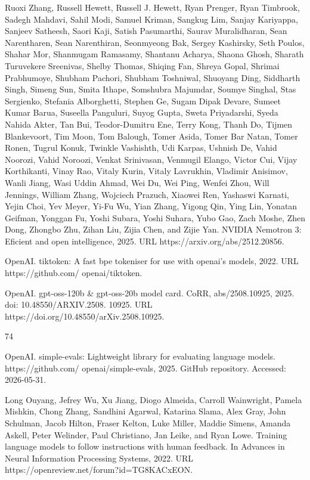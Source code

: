 \documentclass[
  10
]{article}
\begin{document}
Ruoxi Zhang, Russell Hewett, Russell J. Hewett, Ryan Prenger, Ryan
Timbrook, Sadegh Mahdavi, Sahil Modi, Samuel Kriman, Sangkug Lim, Sanjay
Kariyappa, Sanjeev Satheesh, Saori Kaji, Satish Pasumarthi, Saurav
Muralidharan, Sean Narentharen, Sean Narenthiran, Seonmyeong Bak, Sergey
Kashirsky, Seth Poulos, Shahar Mor, Shanmugam Ramasamy, Shantanu
Acharya, Shaona Ghosh, Sharath Turuvekere Sreenivas, Shelby Thomas,
Shiqing Fan, Shreya Gopal, Shrimai Prabhumoye, Shubham Pachori, Shubham
Toshniwal, Shuoyang Ding, Siddharth Singh, Simeng Sun, Smita Ithape,
Somshubra Majumdar, Soumye Singhal, Stas Sergienko, Stefania
Alborghetti, Stephen Ge, Sugam Dipak Devare, Sumeet Kumar Barua,
Suseella Panguluri, Suyog Gupta, Sweta Priyadarshi, Syeda Nahida Akter,
Tan Bui, Teodor-Dumitru Ene, Terry Kong, Thanh Do, Tijmen Blankevoort,
Tim Moon, Tom Balough, Tomer Asida, Tomer Bar Natan, Tomer Ronen, Tugrul
Konuk, Twinkle Vashishth, Udi Karpas, Ushnish De, Vahid Noorozi, Vahid
Noroozi, Venkat Srinivasan, Venmugil Elango, Victor Cui, Vijay
Korthikanti, Vinay Rao, Vitaly Kurin, Vitaly Lavrukhin, Vladimir
Anisimov, Wanli Jiang, Wasi Uddin Ahmad, Wei Du, Wei Ping, Wenfei Zhou,
Will Jennings, William Zhang, Wojciech Prazuch, Xiaowei Ren, Yashaswi
Karnati, Yejin Choi, Yev Meyer, Yi-Fu Wu, Yian Zhang, Yigong Qin, Ying
Lin, Yonatan Geifman, Yonggan Fu, Yoshi Subara, Yoshi Suhara, Yubo Gao,
Zach Moshe, Zhen Dong, Zhongbo Zhu, Zihan Liu, Zijia Chen, and Zijie
Yan. NVIDIA Nemotron 3: Eficient and open intelligence, 2025. URL
https://arxiv.org/abs/2512.20856.

OpenAI. tiktoken: A fast bpe tokeniser for use with openai's models,
2022. URL https://github.com/ openai/tiktoken.

OpenAI. gpt-oss-120b \& gpt-oss-20b model card. CoRR, abs/2508.10925,
2025. doi: 10.48550/ARXIV.2508. 10925. URL
https://doi.org/10.48550/arXiv.2508.10925.

74

OpenAI. simple-evals: Lightweight library for evaluating language
models. https://github.com/ openai/simple-evals, 2025. GitHub
repository. Accessed: 2026-05-31.

Long Ouyang, Jefrey Wu, Xu Jiang, Diogo Almeida, Carroll Wainwright,
Pamela Mishkin, Chong Zhang, Sandhini Agarwal, Katarina Slama, Alex
Gray, John Schulman, Jacob Hilton, Fraser Kelton, Luke Miller, Maddie
Simens, Amanda Askell, Peter Welinder, Paul Christiano, Jan Leike, and
Ryan Lowe. Training language models to follow instructions with human
feedback. In Advances in Neural Information Processing Systems, 2022.
URL https://openreview.net/forum?id=TG8KACxEON.
\end{document}
